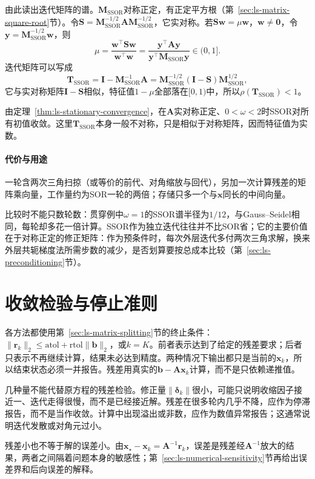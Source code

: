 由此读出迭代矩阵的谱。$\bm M_{\mathrm{SSOR}}$对称正定，有正定平方根（第~\ref{sec:ls-matrix-square-root}节）。令$\bm S=\bm M_{\mathrm{SSOR}}^{-1/2}\bm A\bm M_{\mathrm{SSOR}}^{-1/2}$，它实对称。若$\bm S\bm w=\mu\bm w$，$\bm w\neq\bm0$，令$\bm y=\bm M_{\mathrm{SSOR}}^{-1/2}\bm w$，则
\[
\mu=\frac{\bm w^\top\bm S\bm w}{\bm w^\top\bm w}=\frac{\bm y^\top\bm A\bm y}{\bm y^\top\bm M_{\mathrm{SSOR}}\bm y}\in(0,1].
\]
迭代矩阵可以写成
\[
 \bm T_{\mathrm{SSOR}}=\bm I-\bm M_{\mathrm{SSOR}}^{-1}\bm A=\bm M_{\mathrm{SSOR}}^{-1/2}(\bm I-\bm S)\bm M_{\mathrm{SSOR}}^{1/2} ,
\]
它与实对称矩阵$\bm I-\bm S$相似，特征值$1-\mu$全部落在$[0,1)$中，所以$\rho(\bm T_{\mathrm{SSOR}})<1$。

由定理~\ref{thm:ls-stationary-convergence}，在$\bm A$实对称正定、$0<\omega<2$时SSOR对所有初值收敛。这里$\bm T_{\mathrm{SSOR}}$本身一般不对称，只是相似于对称矩阵，因而特征值为实数。

\paragraph{代价与用途}
一轮含两次三角扫掠（或等价的前代、对角缩放与回代），另加一次计算残差的矩阵乘向量，工作量约为SOR一轮的两倍；存储只多一个与$\bm x$同长的中间向量。

比较时不能只数轮数：贯穿例中$\omega=1$的SSOR谱半径为$1/12$，与Gauss--Seidel相同，每轮却多花一倍计算。SSOR作为独立迭代往往并不比SOR省；它的主要价值在于对称正定的修正矩阵：作为预条件时，每次外层迭代多付两次三角求解，换来外层共轭梯度法所需步数的减少，是否划算要按总成本比较（第~\ref{sec:ls-preconditioning}节）。

\section{收敛检验与停止准则}
\label{sec:ls-stationary-stopping}

各方法都使用第~\ref{sec:ls-matrix-splitting}节的终止条件：$\lVert\bm r_k\rVert_2\leq\mathrm{atol}+\mathrm{rtol}\lVert\bm b\rVert_2$，或$k=K$。前者表示达到了给定的残差要求；后者只表示不再继续计算，结果未必达到精度。两种情况下输出都只是当前的$\bm x_k$，所以结束状态必须一并报告。残差用真实的$\bm b-\bm A\bm x_k$计算，而不是只依赖递推值。

几种量不能代替原方程的残差检验。修正量$\lVert\bm\delta_k\rVert$很小，可能只说明收缩因子接近一、迭代走得很慢，而不是已经接近解。残差在很多轮内几乎不降，应作为停滞报告，而不是当作收敛。计算中出现溢出或非数，应作为数值异常报告；这通常说明迭代发散或对角元过小。

残差小也不等于解的误差小。由$\bm x_\star-\bm x_k=\bm A^{-1}\bm r_k$，误差是残差经$\bm A^{-1}$放大的结果，两者之间隔着问题本身的敏感性；第~\ref{sec:ls-numerical-sensitivity}节再给出误差界和后向误差的解释。

